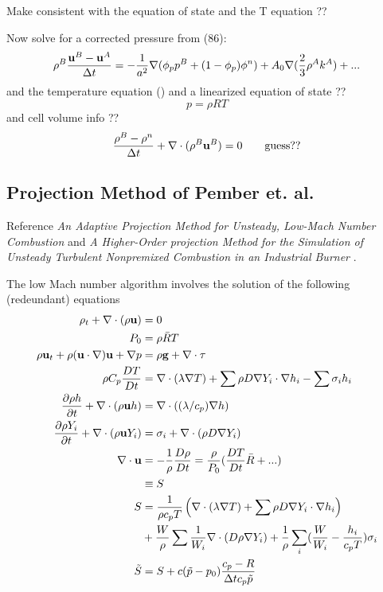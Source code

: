 \documentclass[10pt]{article}
\begin{document}
Make consistent with the equation of state and the T equation ??

Now solve for a corrected pressure from
(86):
\[
 \rho^B { {\bf u}^B-{\bf u}^A \over {\Delta t}} = - {1\over a^2} \nabla( \phi_p p^B + (1-\phi_p)\phi^n )
          + A_0\nabla( {2\over 3} \rho^A k^A) +...
\]
and the temperature equation (\label{eq:kiva:te})
and a linearized equation of state ??
\[
   p = \rho R T
\]
and cell volume info ??
\[
  {\rho^B-\rho^n \over {\Delta t}} + \nabla\cdot( \rho^B {\bf u}^B ) =0   \qquad \mbox{guess??}
\]


\subsection{Projection Method of Pember et. al.}

Reference 
{\sl An Adaptive Projection Method for Unsteady, Low-Mach Number Combustion}
and
{\sl A Higher-Order projection Method for the Simulation of Unsteady Turbulent
Nonpremixed Combustion in an Industrial Burner} \cite{Pember??}.

The low Mach number algorithm involves the solution of the following (redeundant) equations 
\begin{align}
  \rho_t + \nabla\cdot( \rho{\bf u} ) &= 0 \\
   P_0 & = \rho \bar{R} T \\
   \rho {\bf u}_t + \rho ({\bf u}\cdot\nabla){\bf u} + \nabla p & = \rho{\bf g} + \nabla\cdot {\bf \tau}  \\
 \rho C_p {DT\over Dt} &= \nabla\cdot( \lambda \nabla T ) + 
       \sum \rho D \nabla Y_i\cdot\nabla h_i - \sum \sigma_i h_i \\
 {\partial \rho h \over \partial t} + \nabla\cdot( \rho {\bf u} h ) &= \nabla\cdot( (\lambda/c_p) \nabla h ) \\
 {\partial \rho Y_i \over \partial t} + \nabla\cdot(\rho{\bf u} Y_i) &= \sigma_i +\nabla\cdot(\rho D \nabla Y_i ) \\
   \nabla\cdot{\bf u} &= -{1\over\rho} {D\rho\over Dt} = {\rho \over P_0} ( {DT\over Dt} \bar{R} + ...) \\
          &\equiv S \\
 S &= {1\over \rho c_p T} \left( \nabla\cdot(\lambda\nabla T) + \sum \rho D\nabla Y_i\cdot\nabla h_i \right) \\
    & + {W\over \rho} \sum {1\over W_i}\nabla\cdot(D\rho\nabla Y_i) +
          {1\over \rho} \sum_i( {W\over W_i} - {h_i\over c_p T})\sigma_i \\
 \tilde{S} &= S + c (\tilde{p}-p_0) { c_p - R \over \Delta t c_p \tilde{p} }
\end{align}
\end{document}
